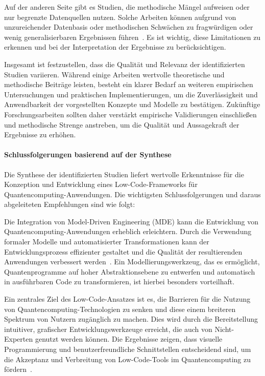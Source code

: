 Auf der anderen Seite gibt es Studien, die methodische Mängel aufweisen oder nur begrenzte Datenquellen nutzen. Solche 
Arbeiten können aufgrund von unzureichender Datenbasis oder methodischen Schwächen zu fragwürdigen oder wenig 
generalisierbaren Ergebnissen führen~\cite{Khorram_2020}. Es ist wichtig, diese Limitationen zu erkennen und bei 
der Interpretation der Ergebnisse zu berücksichtigen.

Insgesamt ist festzustellen, dass die Qualität und Relevanz der identifizierten Studien variieren. Während einige 
Arbeiten wertvolle theoretische und methodische Beiträge leisten, besteht ein klarer Bedarf an weiteren empirischen 
Untersuchungen und praktischen Implementierungen, um die Zuverlässigkeit und Anwendbarkeit der vorgestellten Konzepte 
und Modelle zu bestätigen. Zukünftige Forschungsarbeiten sollten daher verstärkt empirische Validierungen einschließen 
und methodische Strenge anstreben, um die Qualität und Aussagekraft der Ergebnisse zu erhöhen. 

\paragraph{Schlussfolgerungen basierend auf der Synthese}

Die Synthese der identifizierten Studien liefert wertvolle Erkenntnisse für die Konzeption und Entwicklung eines Low-Code-Frameworks 
für Quantencomputing-Anwendungen. Die wichtigsten Schlussfolgerungen und daraus abgeleiteten Empfehlungen sind wie folgt:

Die Integration von Model-Driven Engineering (MDE) kann die Entwicklung von Quantencomputing-Anwendungen erheblich erleichtern. 
Durch die Verwendung formaler Modelle und automatisierter Transformationen kann der Entwicklungsprozess effizienter gestaltet 
und die Qualität der resultierenden Anwendungen verbessert werden~\cite{France_2007, Selic_2003}. Ein Modellierungswerkzeug, 
das es ermöglicht, Quantenprogramme auf hoher Abstraktionsebene zu entwerfen und automatisch in ausführbaren Code zu transformieren, 
ist hierbei besonders vorteilhaft.

Ein zentrales Ziel des Low-Code-Ansatzes ist es, die Barrieren für die Nutzung von Quantencomputing-Technologien zu senken und 
diese einem breiteren Spektrum von Nutzern zugänglich zu machen. Dies wird durch die Bereitstellung intuitiver, grafischer 
Entwicklungswerkzeuge erreicht, die auch von Nicht-Experten genutzt werden können. Die Ergebnisse zeigen, dass visuelle 
Programmierung und benutzerfreundliche Schnittstellen entscheidend sind, um die Akzeptanz und Verbreitung von Low-Code-Tools 
im Quantencomputing zu fördern~\cite{Khorram_2020}.

